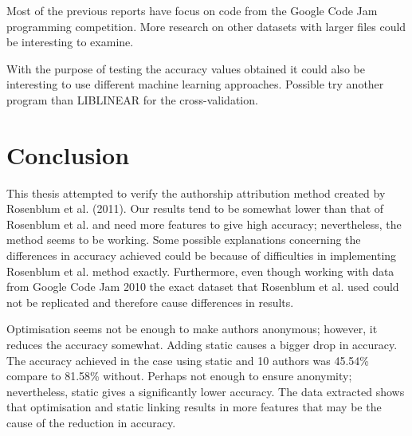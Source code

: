\documentclass[a4paper,11pt]{kth-mag}
\begin{document}
Most of the previous reports have focus on code from the Google Code Jam
programming competition. More research on other datasets with larger files
could be interesting to examine.

With the purpose of testing the accuracy values obtained it could also be
interesting to use different machine learning approaches. Possible try another
program than LIBLINEAR for the cross-validation.

\chapter{Conclusion}
This thesis attempted to verify the authorship attribution method created by
Rosenblum et al. (2011). Our results tend to be somewhat lower than that of
Rosenblum et al. and need more features to give high accuracy; nevertheless,
the method seems to be working. Some possible explanations concerning the
differences in accuracy achieved could be because of difficulties in
implementing Rosenblum et al. method exactly. Furthermore, even though working
with data from Google Code Jam 2010 the exact dataset that Rosenblum et al.
used could not be replicated and therefore cause differences in results. 

Optimisation seems not be enough to make authors anonymous; however, it reduces
the accuracy somewhat. Adding static causes a bigger drop in accuracy. The
accuracy achieved in the case using static and 10 authors was 45.54\% compare
to 81.58\% without. Perhaps not enough to ensure anonymity; nevertheless,
static gives a significantly lower accuracy. The data extracted shows that
optimisation and static linking results in more features that may be the cause
of the reduction in accuracy.
\end{document}
